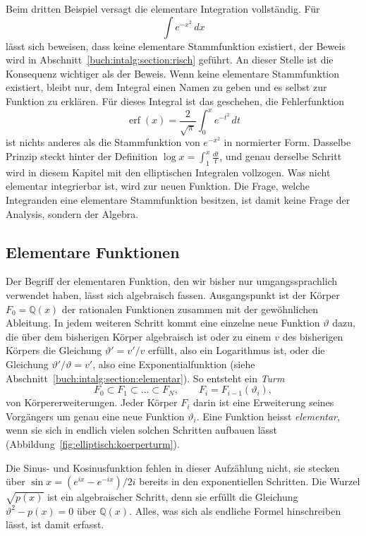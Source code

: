 Beim dritten Beispiel versagt die elementare Integration
vollständig.
Für
\begin{equation}
\int e^{-x^2}\,dx
\label{elliptisch:equation:expx2}
\end{equation}
lässt sich beweisen, dass keine elementare Stammfunktion existiert,
der Beweis wird in Abschnitt~\ref{buch:intalg:section:risch}
geführt.
An dieser Stelle ist die Konsequenz wichtiger als der Beweis.
Wenn keine elementare Stammfunktion existiert, bleibt nur, dem
Integral einen Namen zu geben und es selbst zur Funktion zu
erklären.
Für dieses Integral ist das geschehen, die Fehlerfunktion
\begin{equation}
\operatorname{erf}(x)
=
\frac{2}{\sqrt{\pi}} \int_0^x e^{-t^2}\,dt
\label{elliptisch:equation:erfx}
\end{equation}
ist nichts anderes als die Stammfunktion von $e^{-x^2}$ in
normierter Form.
%
Dasselbe Prinzip steckt hinter der Definition
$\log x = \int_1^x \frac{dt}{t}$,
und genau derselbe Schritt wird in diesem Kapitel mit den
elliptischen Integralen vollzogen.
Was nicht elementar integrierbar ist, wird zur neuen Funktion.
Die Frage, welche Integranden eine elementare Stammfunktion
besitzen, ist damit keine Frage der Analysis, sondern der Algebra.

\subsection{Elementare Funktionen}
Der Begriff der elementaren Funktion, den wir bisher nur
umgangssprachlich verwendet haben, lässt sich algebraisch fassen.
Ausgangspunkt ist der Körper $F_0 = \mathbb{Q}(x)$ der rationalen
Funktionen zusammen mit der gewöhnlichen Ableitung.
In jedem weiteren Schritt kommt eine einzelne neue Funktion
$\vartheta$ dazu, die über dem bisherigen Körper algebraisch ist oder
zu einem $v$ des bisherigen Körpers die Gleichung $\vartheta' = v'/v$
erfüllt, also ein Logarithmus ist, oder die Gleichung
$\vartheta'/\vartheta = v'$, also eine Exponentialfunktion
(siehe Abschnitt~\ref{buch:intalg:section:elementar}).
So entsteht ein \emph{Turm}
\begin{equation}
F_0 \subset F_1 \subset \dots \subset F_N,
\qquad
F_i = F_{i-1}(\vartheta_i),
\label{elliptisch:equation:koerperturm}
\end{equation}
von Körpererweiterungen.
Jeder Körper $F_i$ darin ist eine Erweiterung seines Vorgängers um
genau eine neue Funktion $\vartheta_i$.
Eine Funktion heisst \emph{elementar}, wenn sie sich in endlich
vielen solchen Schritten aufbauen lässt
(Abbildung~\ref{fig:elliptisch:koerperturm}).
%
%

Die Sinus- und Kosinusfunktion fehlen in dieser Aufzählung nicht,
sie stecken über $\sin x = (e^{ix}-e^{-ix})/2i$ bereits in den
exponentiellen Schritten.
Die Wurzel $\sqrt{p(x)}$ ist ein algebraischer Schritt, denn sie
erfüllt die Gleichung $\vartheta^2 - p(x) = 0$ über
$\mathbb{Q}(x)$.
Alles, was sich als endliche Formel hinschreiben lässt, ist damit
erfasst.

